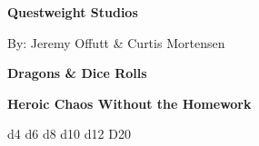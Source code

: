 
\begin{center}
  {\sffamily\bfseries Questweight Studios}\par
  {\scriptsize By: Jeremy Offutt \& Curtis Mortensen}\par
  \vspace{4pt}
  \DndrGraphicPlaceholder[0.62\linewidth]{1.45in}
  \vspace{-3pt}
  {\Huge\bfseries\color{DndrGold} Dragons \& Dice Rolls}\par
  {\large\bfseries Heroic Chaos Without the Homework}\par
  {\small d4 \quad d6 \quad d8 \quad d10 \quad d12 \quad D20}
\end{center}

